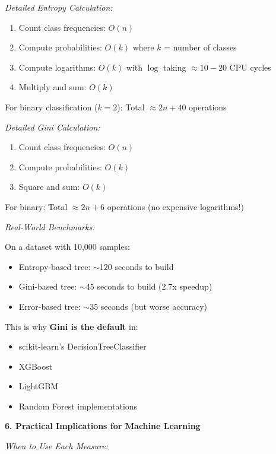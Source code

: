 \documentclass[12pt]{article}
\begin{document}
\begin{explanation}
\textit{Detailed Entropy Calculation:}
\begin{enumerate}
    \item Count class frequencies: $O(n)$
    \item Compute probabilities: $O(k)$ where $k$ = number of classes
    \item Compute logarithms: $O(k)$ with $\log$ taking $\approx 10-20$ CPU cycles
    \item Multiply and sum: $O(k)$
\end{enumerate}

For binary classification ($k=2$): Total $\approx 2n + 40$ operations

\textit{Detailed Gini Calculation:}
\begin{enumerate}
    \item Count class frequencies: $O(n)$
    \item Compute probabilities: $O(k)$
    \item Square and sum: $O(k)$
\end{enumerate}

For binary: Total $\approx 2n + 6$ operations (no expensive logarithms!)

\textit{Real-World Benchmarks:}

On a dataset with 10,000 samples:
\begin{itemize}
    \item Entropy-based tree: $\sim$120 seconds to build
    \item Gini-based tree: $\sim$45 seconds to build (2.7x speedup)
    \item Error-based tree: $\sim$35 seconds (but worse accuracy)
\end{itemize}

This is why \textbf{Gini is the default} in:
\begin{itemize}
    \item scikit-learn's DecisionTreeClassifier
    \item XGBoost
    \item LightGBM
    \item Random Forest implementations
\end{itemize}

\textbf{6. Practical Implications for Machine Learning}

\textit{When to Use Each Measure:}


\end{explanation}
\end{document}
